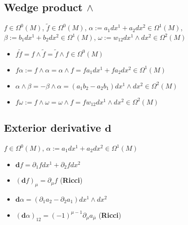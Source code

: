\documentclass{scrartcl}
\newcommand{\exd}{\mathbf{d}}
\begin{document}
    \subsection{Wedge product \( \wedge \)}
      \( f\in \Omega^{0}(M)\),
      \( \tilde{f}\in \Omega^{0}(M) \),
      \( \alpha:= a_{1}dx^{1} + a_{2}dx^{2} \in \Omega^{1}(M) \),
      \( \beta:= b_{1}dx^{1} + b_{2}dx^{2} \in \Omega^{1}(M) \),
      \( \omega:= w_{12}dx^{1}\wedge dx^{2} \in \Omega^{2}(M) \)
      \begin{itemize}
        \item \( f\tilde{f}= f\wedge\tilde{f} = \tilde{f}\wedge f \in \Omega^{0}(M) \)
        \item \( f\alpha := f\wedge\alpha = \alpha\wedge f =  fa_{1}dx^{1} + fa_{2}dx^{2} \in \Omega^{1}(M)\)
        \item \( \alpha\wedge\beta = - \beta\wedge\alpha = \left( a_{1}b_{2} - a_{2}b_{1} \right) dx^{1}\wedge dx^{2} \in \Omega^{2}(M) \)
        \item \( f\omega := f\wedge\omega = \omega\wedge f = fw_{12}dx^{1}\wedge dx^{2} \in \Omega^{2}(M) \)
      \end{itemize}
      
    \subsection{Exterior derivative \( \exd \)}
      \( f\in \Omega^{0}(M)\), 
      \( \alpha:= a_{1}dx^{1} + a_{2}dx^{2} \in \Omega^{1}(M) \)
      \begin{itemize}
        \item \( \exd f = \partial_{1}fdx^{1} + \partial_{2}fdx^{2} \)
        \item \( \left( \exd f \right)_{\mu} = \partial_{\mu}f \)  (\textbf{Ricci})
        \item \( \exd\alpha = \left( \partial_{1}a_{2} - \partial_{2}a_{1} \right) dx^{1}\wedge dx^{2}\)
        \item \( (\exd\alpha)_{12} = (-1)^{\mu-1}\partial_{\mu}a_{\bar{\mu}} \) (\textbf{Ricci})
      \end{itemize}
\end{document}
